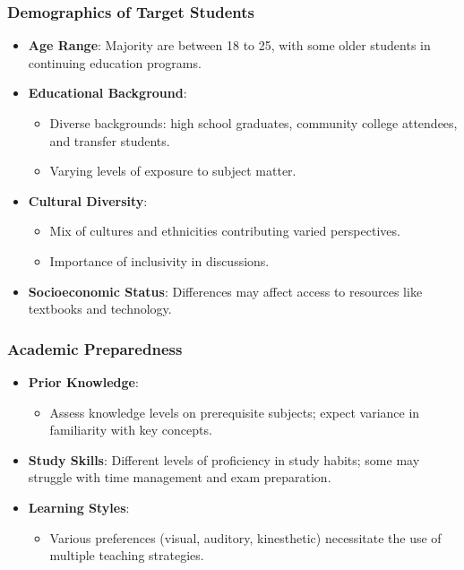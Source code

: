 \documentclass[aspectratio=169]{beamer}
\begin{document}
\begin{frame}[fragile]
  \frametitle{Demographics of Target Students}
  \begin{itemize}
    \item \textbf{Age Range}: Majority are between 18 to 25, with some older students in continuing education programs.
    \item \textbf{Educational Background}: 
    \begin{itemize}
      \item Diverse backgrounds: high school graduates, community college attendees, and transfer students.
      \item Varying levels of exposure to subject matter.
    \end{itemize}
    \item \textbf{Cultural Diversity}: 
      \begin{itemize}
        \item Mix of cultures and ethnicities contributing varied perspectives.
        \item Importance of inclusivity in discussions.
      \end{itemize}
    \item \textbf{Socioeconomic Status}: Differences may affect access to resources like textbooks and technology.
  \end{itemize}
\end{frame}

\begin{frame}[fragile]
  \frametitle{Academic Preparedness}
  \begin{itemize}
    \item \textbf{Prior Knowledge}:
    \begin{itemize}
      \item Assess knowledge levels on prerequisite subjects; expect variance in familiarity with key concepts.
    \end{itemize}
    \item \textbf{Study Skills}: Different levels of proficiency in study habits; some may struggle with time management and exam preparation.
    \item \textbf{Learning Styles}: 
    \begin{itemize}
      \item Various preferences (visual, auditory, kinesthetic) necessitate the use of multiple teaching strategies.
    \end{itemize}
  \end{itemize}
\end{frame}
\end{document}
